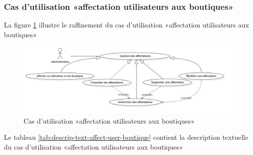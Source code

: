\subsubsection{Cas d’utilisation «affectation  utilisateurs aux boutiques»}
La figure \ref{fig:usecase-affectation} illustre le raffinement du cas d’utilisation «affectation utilisateurs aux boutiques»
\begin{figure}[H]
	\centering
	\includegraphics[width=1\linewidth]{"img/conception/usecases/sprint 2/UseCase-affectation"}
	\caption[Diagramme cas d’utilisation «affectation utilisateurs aux boutiques»]{Cas d’utilisation «affectation utilisateurs aux boutiques»}
	\label{fig:usecase-affectation}
\end{figure}
Le tableau \ref{tab:descrip-text-affect-user-boutique} contient la description textuelle du cas d’utilisation «affectation utilisateurs aux boutiques»
